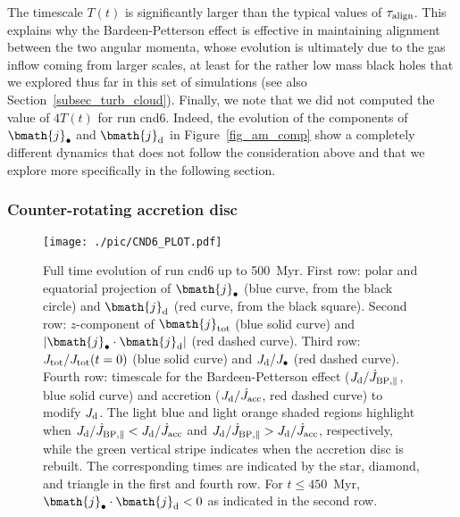 \documentclass[a4paper,fleqn,usenatbib]{mnras}
\begin{document}
The timescale $T(t)$ is significantly larger than the typical values of $\tau_{\rm align}$.
This explains why the Bardeen-Petterson effect is effective in maintaining alignment between the two angular momenta, whose evolution is ultimately due to the gas inflow coming from larger scales, at least for the rather low mass black holes that we explored thus far in this set of simulations (see also Section~\ref{subsec_turb_cloud}).
Finally, we note that we did not computed the value of $4 T(t)$ for run cnd6.
Indeed, the evolution of the components of $\bmath{j}_{\bullet}$ and $\bmath{j}_{\rm d}$ in Figure~\ref{fig_am_comp} show a completely different dynamics that does not follow the consideration above and that we explore more specifically in the following section.

\subsubsection{Counter-rotating accretion disc}\label{subsub_counter}

\begin{figure}
\begin{center}
\texttt{[image: ./pic/CND6\_PLOT.pdf]}
\caption{Full time evolution of run cnd6 up to 500~Myr.
First row: polar and equatorial projection of $\bmath{j}_{\bullet}$ (blue curve, from the black circle) and $\bmath{j}_{\rm d}$ (red curve, from the black square).
Second row: $z$-component of $\bmath{j}_{\rm tot}$ (blue solid curve) and $|\bmath{j}_{\bullet} \cdot \bmath{j}_{\rm d}|$ (red dashed curve).
Third row: $J_{\rm tot} / J_{\rm tot}(t=0)$ (blue solid curve) and $J_{\rm d}/J_{\bullet}$ (red dashed curve).
Fourth row: timescale for the Bardeen-Petterson effect ($J_{\rm d}/\dot{J}_{\rm BP, \parallel}$, blue solid curve) and accretion ($J_{\rm d}/\dot{J}_{\rm acc}$, red dashed curve) to modify $J_{\rm d}$.
The light blue and light orange shaded regions highlight when $J_{\rm d}/\dot{J}_{\rm BP, \parallel} < J_{\rm d}/\dot{J}_{\rm acc}$ and $J_{\rm d}/\dot{J}_{\rm BP, \parallel} > J_{\rm d}/\dot{J}_{\rm acc}$, respectively, while the green vertical stripe indicates when the accretion disc is rebuilt.
The corresponding times are indicated by the star, diamond, and triangle in the first and fourth row.
For $t \leq 450$~Myr, $\bmath{j}_{\bullet} \cdot \bmath{j}_{\rm d} < 0$ as indicated in the second row.
}
\label{fig_cnd6}
\end{center}
\end{figure}
\end{document}

